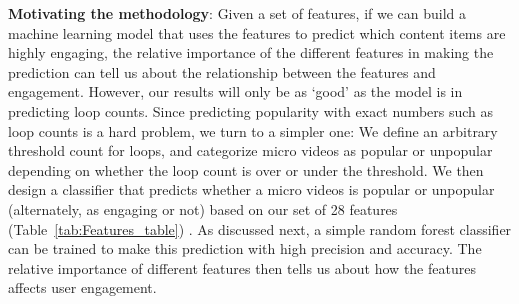 \noindent\textbf{Motivating the methodology}: 
 Given a set of features, if we can build a machine learning model that uses the features to predict which content items are highly engaging, the relative importance of the different features in making the prediction can tell us about the relationship between the features and engagement. However, our results will only be as `good' as the model is in predicting loop counts. Since predicting popularity with exact numbers such as loop counts is a hard problem, we turn to a simpler one: We define an arbitrary threshold count for loops, and categorize micro videos as popular or unpopular depending on whether the loop count is over or under the threshold.  We then design a classifier that predicts whether a micro videos is popular or unpopular (alternately, as engaging or not) based on our set of 28 features (Table~\ref{tab:Features_table}) . As discussed next, a simple random forest classifier can be trained to make this prediction with high precision and accuracy. The relative importance of different features then tells us about how the features affects user engagement.

